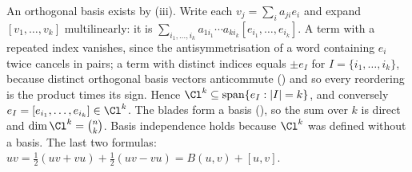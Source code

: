 An orthogonal basis exists by (iii). Write each $v_j = \sum_i a_{ji} e_i$ and expand $[v_1, \dots, v_k]$ multilinearly: it is $\sum_{i_1, \dots, i_k} a_{1 i_1} \cdots a_{k i_k} [e_{i_1}, \dots, e_{i_k}]$. A term with a repeated index vanishes, since the antisymmetrisation of a word containing $e_i$ twice cancels in pairs; a term with distinct indices equals $\pm e_I$ for $I = \{i_1, \dots, i_k\}$, because distinct orthogonal basis vectors anticommute () and so every reordering is the product times its sign. Hence $\Cl^{k} \subseteq \operatorname{span}\{e_I : |I| = k\}$, and conversely $e_I = [e_{i_1}, \dots, e_{i_k}] \in \Cl^{k}$. The blades form a basis (), so the sum over $k$ is direct and $\dim \Cl^{k} = \binom{n}{k}$. Basis independence holds because $\Cl^{k}$ was defined without a basis. The last two formulas: $uv = \tfrac12(uv + vu) + \tfrac12(uv - vu) = B(u, v) + [u, v]$.
